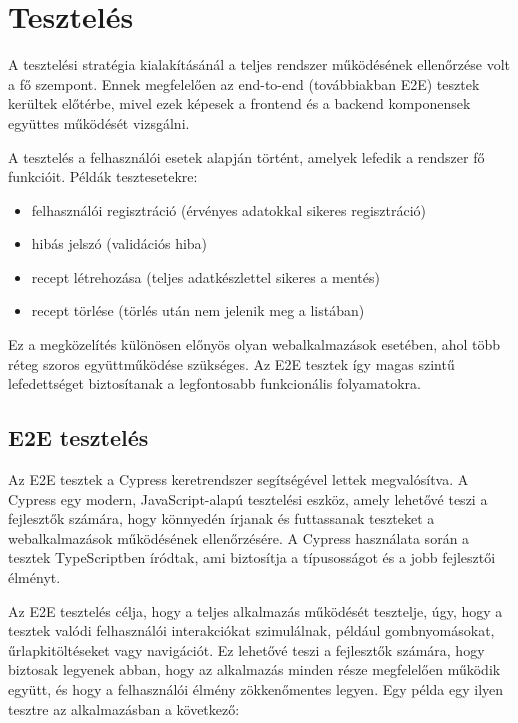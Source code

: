 ﻿\section{Tesztelés}\label{ch:testing}

A tesztelési stratégia kialakításánál a teljes rendszer működésének ellenőrzése volt a fő szempont. Ennek megfelelően az end-to-end (továbbiakban E2E) tesztek kerültek előtérbe, mivel ezek képesek a frontend és a backend komponensek együttes működését vizsgálni.

A tesztelés a felhasználói esetek alapján történt, amelyek lefedik a rendszer fő funkcióit.
Példák tesztesetekre:
\begin{itemize}
	\item felhasználói regisztráció (érvényes adatokkal sikeres regisztráció)
	\item hibás jelszó (validációs hiba)
	\item recept létrehozása (teljes adatkészlettel sikeres a mentés)
	\item recept törlése (törlés után nem jelenik meg a listában)
\end{itemize}


Ez a megközelítés különösen előnyös olyan webalkalmazások esetében, ahol több réteg szoros együttműködése szükséges. Az E2E tesztek így magas szintű lefedettséget biztosítanak a legfontosabb funkcionális folyamatokra.

\subsection{E2E tesztelés}

Az E2E tesztek a Cypress keretrendszer segítségével lettek megvalósítva. A Cypress egy modern, JavaScript-alapú tesztelési eszköz, amely lehetővé teszi a fejlesztők számára, hogy könnyedén írjanak és futtassanak teszteket a webalkalmazások működésének ellenőrzésére. A Cypress használata során a tesztek TypeScriptben íródtak, ami biztosítja a típusosságot és a jobb fejlesztői élményt. 


Az E2E tesztelés célja, hogy a teljes alkalmazás működését tesztelje, úgy, hogy a tesztek valódi felhasználói interakciókat szimulálnak, például gombnyomásokat, űrlapkitöltéseket vagy navigációt. Ez lehetővé teszi a fejlesztők számára, hogy biztosak legyenek abban, hogy az alkalmazás minden része megfelelően működik együtt, és hogy a felhasználói élmény zökkenőmentes legyen. Egy példa egy ilyen tesztre az alkalmazásban a következő:

